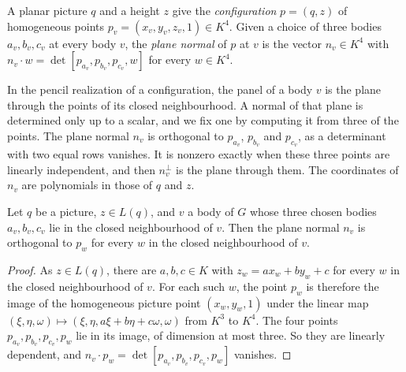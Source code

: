 \begin{definition}
  \label{def:pencil-configuration}
  \leanok
  A planar picture $q$ and a height $z$ give the \emph{configuration}
  $p = (q, z)$ of homogeneous points
  $p_v = (x_v, y_v, z_v, 1) \in K^4$. Given a choice of three bodies
  $a_v, b_v, c_v$ at every body $v$, the \emph{plane normal} of $p$ at
  $v$ is the vector $n_v \in K^4$ with
  $n_v \cdot w = \det[p_{a_v}, p_{b_v}, p_{c_v}, w]$ for every
  $w \in K^4$.
\end{definition}

In the pencil realization of a configuration, the panel of a body $v$ is
the plane through the points of its closed neighbourhood. A normal of
that plane is determined only up to a scalar, and we fix one by computing
it from three of the points. The plane normal $n_v$ is orthogonal to
$p_{a_v}$, $p_{b_v}$ and $p_{c_v}$, as a determinant with two equal rows
vanishes. It is nonzero exactly when these three points are linearly
independent, and then $n_v^{\perp}$ is the plane through them. The
coordinates of $n_v$ are polynomials in those of $q$ and $z$.

\begin{lemma}
  \label{lem:pencil-selector-plane-contains-nbhd}
  \leanok
  Let $q$ be a picture, $z \in L(q)$, and $v$ a body of $G$ whose
  three chosen bodies $a_v, b_v, c_v$ lie in the closed neighbourhood
  of $v$. Then the plane normal $n_v$ is orthogonal to $p_w$ for every
  $w$ in the closed neighbourhood of $v$.
\end{lemma}
\begin{proof}
  \leanok
  As $z \in L(q)$, there are $a, b, c \in K$ with
  $z_w = a x_w + b y_w + c$ for every $w$ in the closed neighbourhood of
  $v$. For each such $w$, the point $p_w$ is therefore the image of the
  homogeneous picture point $(x_w, y_w, 1)$ under the linear map
  $(\xi, \eta, \omega) \mapsto (\xi, \eta, a\xi + b\eta + c\omega, \omega)$
  from $K^3$ to $K^4$. The four points $p_{a_v}, p_{b_v}, p_{c_v}, p_w$
  lie in its image, of dimension at most three. So they are linearly
  dependent, and $n_v \cdot p_w = \det[p_{a_v}, p_{b_v}, p_{c_v}, p_w]$
  vanishes.
\end{proof}

